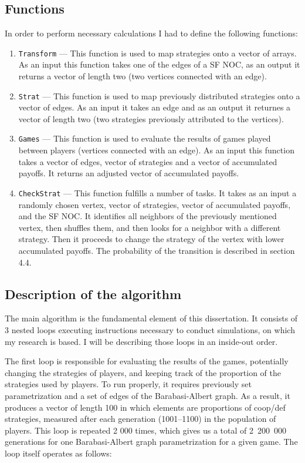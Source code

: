 \documentclass[english, twoside, 12pt, a4paper]{article}
\theoremstyle{definition}
\theoremstyle{plain}
\theoremstyle{remark}
\newcommand{\todo}[1]{\noindent{\color{red}>>~#1}}
\begin{document}
\subsection{Functions}

In order to perform necessary calculations I had to define the following functions:

\begin{enumerate}
  \item \lstinline+Transform+ --- This function is used to map strategies onto a vector of arrays. As an input this function takes one of the edges of a SF NOC,
   as an output it returns a vector of length two (two vertices connected with an edge).
  \item \lstinline+Strat+ --- This function is used to map previously distributed strategies onto a vector of edges. As an input it takes an edge and as an output
   it returnes a vector of length two (two strategies previously attributed to the vertices).
  \item \lstinline+Games+ --- This function is used to evaluate the results of games played between players (vertices connected with an edge). As an input this function
   takes a vector of edges, vector of strategies and a vector of accumulated payoffs. It returns an adjusted vector of accumulated payoffs.
  \item \lstinline+CheckStrat+ --- This function fulfills a number of tasks. It takes as an input a randomly chosen vertex, vector of strategies, vector of accumulated
  payoffs, and the SF NOC. It identifies all neighbors of the previously mentioned vertex, then shuffles them, and then looks for a neighbor
  with a different strategy. Then it proceeds to change the strategy of the vertex with lower accumulated payoffs. The probability of the transition 
  is described in section 4.4. \todo{Jak dodać odnośnik do podrozdziału 4.4?} 
\end{enumerate}

\subsection{Description of the algorithm}

The main algorithm is the fundamental element of this dissertation. It consists of 3 nested loops executing instructions necessary to conduct simulations, on which my research is based. I will be describing those loops in an inside-out order. 

The first loop is responsible for evaluating the results of the games, potentially changing the strategies of players, and keeping track of the proportion of the strategies used by players. To run properly, it requires previously set parametrization and a set of edges of the Barabasi-Albert graph. As a result, it produces a vector of length 100 in which elements are proportions of coop/def strategies, measured after each generation (1001--1100) in the population of players. This loop is repeated 2 000 times, which gives us a total of 2~200~000 generations for one Barabasi-Albert graph parametrization for a given game.
The loop itself operates as follows:
\end{document}
